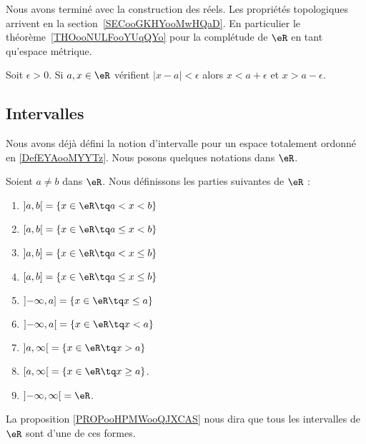 Nous avons terminé avec la construction des réels. Les propriétés topologiques arrivent en la section~\ref{SECooGKHYooMwHQaD}. En particulier le théorème~\ref{THOooNULFooYUqQYo} pour la complétude de \( \eR\) en tant qu'espace métrique.

\begin{lemma}	\label{LEMooSWBTooSkmheK}
	Soit \( \epsilon>0\). Si \( a,x\in \eR\) vérifient \( | x-a |<\epsilon\) alors \( x<a+\epsilon\) et \( x>a-\epsilon\).
\end{lemma}


\subsection{Intervalles}

Nous avons déjà défini la notion d'intervalle pour un espace totalement ordonné en \ref{DefEYAooMYYTz}. Nous posons quelques notations dans \( \eR\).

\begin{definition}  \label{DEFooAQBUooKLChOW}
	Soient \( a\neq b\) dans \( \eR\). Nous définissons les parties suivantes de \( \eR\) :
	\begin{enumerate}
		\item
		      \( \mathopen] a , b \mathclose[=\{ x\in \eR\tq a<x<b \}\)
		\item
		      \( \mathopen[ a , b \mathclose[=\{ x\in \eR\tq a\leq x<b \}\)
		\item
		      \( \mathopen] a , b \mathclose]=\{ x\in \eR\tq a<x\leq b \}\)
		\item
		      \( \mathopen[ a , b \mathclose]=\{ x\in \eR\tq a\leq x\leq b \}\)
		\item
		      \( \mathopen]-\infty , a \mathclose]=\{ x\in \eR\tq x\leq a \}\)
		\item
		      \( \mathopen]-\infty , a \mathclose[=\{ x\in \eR\tq x< a \}\)
		\item
		      \( \mathopen] a , \infty \mathclose[=\{ x\in \eR\tq x>a \}\)
		\item
		      \( \mathopen[ a , \infty \mathclose[=\{ x\in \eR\tq x\geq a \}\).
		\item
		      \( \mathopen] -\infty , \infty \mathclose[=\eR\).
	\end{enumerate}
	La proposition \ref{PROPooHPMWooQJXCAS} nous dira que tous les intervalles de \( \eR\) sont d'une de ces formes.
\end{definition}


